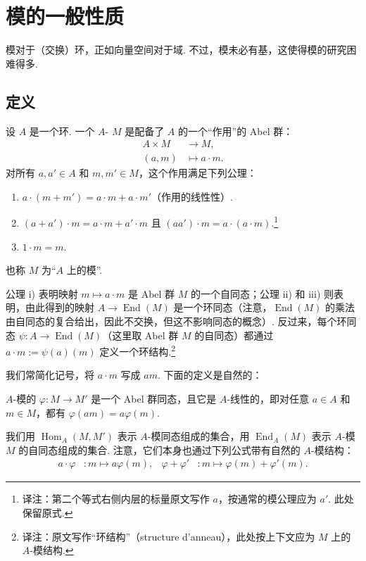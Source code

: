 \section{模的一般性质}\label{sec:galois-1-3}
模对于（交换）环，正如向量空间对于域. 不过，模未必有基，这使得模的研究困难得多.

\subsection{定义}\label{sec:galois-1-3-1}
设 $A$ 是一个环. 一个 $A$- $M$ 是配备了 $A$ 的一个``作用''的 Abel 群：
\begin{align*}
 A\times M&\longrightarrow M,\\
 (a,m)&\longmapsto a\cdot m.
\end{align*}
对所有 $a,a'\in A$ 和 $m,m'\in M$，这个作用满足下列公理：
\begin{enumerate}[label=\roman*)]
\item $a\cdot(m+m')=a\cdot m+a\cdot m'$（作用的线性性）.
\item $(a+a')\cdot m=a\cdot m+a'\cdot m$ 且 $(aa')\cdot m=a\cdot(a\cdot m)$.\footnote{译注：第二个等式右侧内层的标量原文写作 $a$，按通常的模公理应为 $a'$. 此处保留原式.}
\item $1\cdot m=m$.
\end{enumerate}
也称 $M$ 为``$A$ 上的模''.
\begin{remark*}
公理 i) 表明映射 $m\mapsto a\cdot m$ 是 Abel 群 $M$ 的一个自同态；公理 ii) 和 iii) 则表明，由此得到的映射 $A\longrightarrow\operatorname{End}(M)$ 是一个环同态（注意，$\operatorname{End}(M)$ 的乘法由自同态的复合给出，因此不交换，但这不影响同态的概念）. 反过来，每个环同态 $\psi\colon A\longrightarrow\operatorname{End}(M)$（这里取 Abel 群 $M$ 的自同态）都通过 $a\cdot m:=\psi(a)(m)$ 定义一个环结构.\footnote{译注：原文写作``环结构''（structure d'anneau），此处按上下文应为 $M$ 上的 $A$-模结构.}
\end{remark*}
我们常简化记号，将 $a\cdot m$ 写成 $am$. 下面的定义是自然的：
\begin{definition*}
$A$-模的 $\varphi\colon M\longrightarrow M'$ 是一个 Abel 群同态，且它是 $A$-线性的，即对任意 $a\in A$ 和 $m\in M$，都有 $\varphi(am)=a\varphi(m)$.
\end{definition*}
我们用 $\operatorname{Hom}_A(M,M')$ 表示 $A$-模同态组成的集合，用 $\operatorname{End}_A(M)$ 表示 $A$-模 $M$ 的自同态组成的集合. 注意，它们本身也通过下列公式带有自然的 $A$-模结构：
\begin{align*}
 a\cdot\varphi&\colon m\longmapsto a\varphi(m),&
 \varphi+\varphi'&\colon m\longmapsto\varphi(m)+\varphi'(m).
\end{align*}
